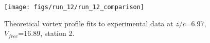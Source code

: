 \begin{figure}[H]
\centering
\texttt{[image: figs/run\_12/run\_12\_comparison]}
\caption{Theoretical vortex profile fits to experimental data at $z/c$=6.97, $V_{free}$=16.89, station 2.}
\label{fig:run_12_comparison}
\end{figure}


